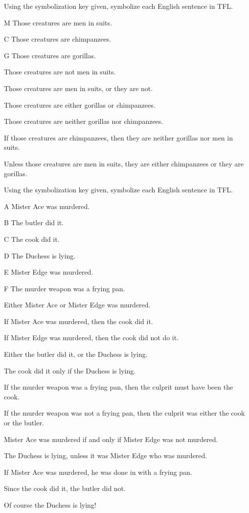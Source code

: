 \practiceproblems
\solutions
\problempart Using the symbolization key given, symbolize each English sentence in TFL.\label{pr.monkeysuits}
	\begin{ekey}
		\item[M] Those creatures are men in suits. 
		\item[C] Those creatures are chimpanzees. 
		\item[G] Those creatures are gorillas.
	\end{ekey}
\begin{earg}
\item Those creatures are not men in suits.
\item Those creatures are men in suits, or they are not.
\item Those creatures are either gorillas or chimpanzees.
\item Those creatures are neither gorillas nor chimpanzees.
\item If those creatures are chimpanzees, then they are neither gorillas nor men in suits.
\item Unless those creatures are men in suits, they are either chimpanzees or they are gorillas.
\end{earg}

\problempart Using the symbolization key given, symbolize each English sentence in TFL.
\begin{ekey}
\item[A] Mister Ace was murdered.
\item[B] The butler did it.
\item[C] The cook did it.
\item[D] The Duchess is lying.
\item[E] Mister Edge was murdered.
\item[F] The murder weapon was a frying pan.
\end{ekey}
\begin{earg}
\item Either Mister Ace or Mister Edge was murdered.
\item If Mister Ace was murdered, then the cook did it.
\item If Mister Edge was murdered, then the cook did not do it.
\item Either the butler did it, or the Duchess is lying.
\item The cook did it only if the Duchess is lying.
\item If the murder weapon was a frying pan, then the culprit must have been the cook.
\item If the murder weapon was not a frying pan, then the culprit was either the cook or the butler.
\item Mister Ace was murdered if and only if Mister Edge was not murdered.
\item The Duchess is lying, unless it was Mister Edge who was murdered.
\item If Mister Ace was murdered, he was done in with a frying pan.
\item Since the cook did it, the butler did not.
\item Of course the Duchess is lying!
\end{earg}
\solutions

